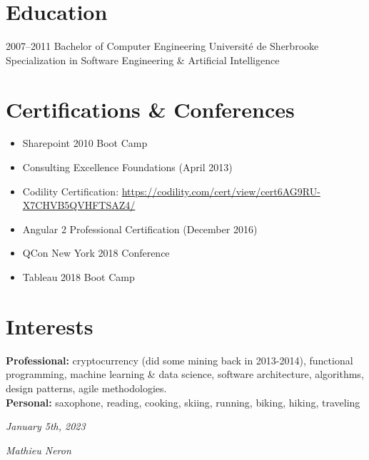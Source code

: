 \documentclass[]{friggeri-cv}
\begin{document}
\section{Education}
\begin{entrylist}
    \entry
{2007--2011}
{Bachelor {\normalfont of Computer Engineering}}
{Université de Sherbrooke}
{Specialization in Software Engineering \& Artificial Intelligence}
\end{entrylist}


\section{Certifications \& Conferences}

\begin{itemize}
	\item Sharepoint 2010 Boot Camp
	\item Consulting Excellence Foundations (April 2013)
	\item Codility Certification: \href{https://codility.com/cert/view/cert6AG9RU-X7CHVB5QVHFTSAZ4/}{https://codility.com/cert/view/cert6AG9RU-X7CHVB5QVHFTSAZ4/}
	\item Angular 2 Professional Certification (December 2016)
	\item QCon New York 2018 Conference
	\item Tableau 2018 Boot Camp
\end{itemize}

\newpage


\section{Interests}

\textbf{Professional:} cryptocurrency (did some mining back in 2013-2014), functional programming, machine learning \& data science, software architecture, algorithms, design patterns, agile methodologies.
\\
\textbf{Personal:} saxophone, reading, cooking, skiing, running, biking, hiking, traveling
\\
\begin{flushleft}
\emph{January 5th, 2023}
\end{flushleft}
\begin{flushright}
\emph{Mathieu Neron}
\end{flushright}
\end{document}
